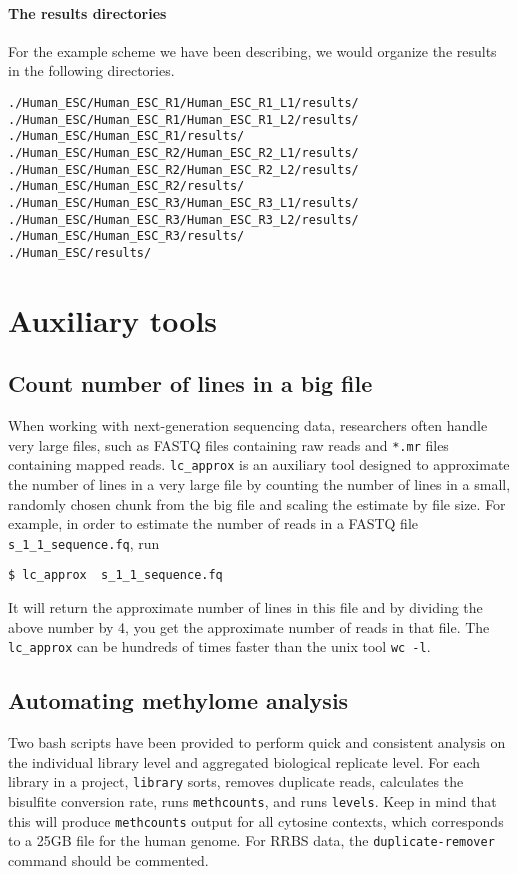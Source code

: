 \documentclass[10pt]{article}
\newcommand{\prog}[1]{\texttt{#1}}
\newcommand{\fn}[1]{\texttt{#1}}
\begin{document}
{{\paragraph{The results directories}
For the example scheme we have been describing, we would organize the
results in the following directories.
\begin{verbatim}
./Human_ESC/Human_ESC_R1/Human_ESC_R1_L1/results/
./Human_ESC/Human_ESC_R1/Human_ESC_R1_L2/results/
./Human_ESC/Human_ESC_R1/results/
./Human_ESC/Human_ESC_R2/Human_ESC_R2_L1/results/
./Human_ESC/Human_ESC_R2/Human_ESC_R2_L2/results/
./Human_ESC/Human_ESC_R2/results/
./Human_ESC/Human_ESC_R3/Human_ESC_R3_L1/results/
./Human_ESC/Human_ESC_R3/Human_ESC_R3_L2/results/
./Human_ESC/Human_ESC_R3/results/
./Human_ESC/results/
\end{verbatim}


\section{Auxiliary tools}
\label{sec:auxiliary-tools}

\subsection{Count number of lines in a big file}
\label{sec:count-number-lines}

When working with next-generation sequencing data, researchers often
handle very large files, such as FASTQ files containing raw reads
and \fn{*.mr} files containing mapped reads. \prog{lc\_approx} is
an auxiliary tool designed to approximate the number of lines in a
very large file by counting the number of lines in a small, randomly
chosen chunk from the big file and scaling the estimate by file size.
For example, in order to estimate the number of reads in a FASTQ file
\fn{s\_1\_1\_sequence.fq}, run
\begin{verbatim}
$ lc_approx  s_1_1_sequence.fq
\end{verbatim}
It will return the approximate number of lines in this file and by
dividing the above number by 4, you get the approximate number of
reads in that file. The \prog{lc\_approx} can be hundreds of times
faster than the unix tool \prog{wc -l}.

\subsection{Automating methylome analysis}
\label{sec:automate-library-level}
Two bash scripts have been provided to perform quick and consistent analysis
on the individual library level and aggregated biological replicate level.
For each library in a project, \prog{library} sorts, removes duplicate
reads, calculates the bisulfite conversion rate, runs \prog{methcounts}, and
runs \prog{levels}. Keep in mind that this will produce \prog{methcounts}
output for all cytosine contexts, which corresponds to a 25GB file for the
human genome. For RRBS data, the \prog{duplicate-remover} command should
be commented.

}}
\end{document}
